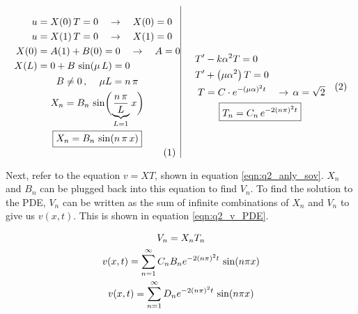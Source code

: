 \documentclass[12pt]{article}
\begin{document}
\begin{subequations}
\begin{array}{c|c}
\begin{minipage}{0.48\textwidth}
\begin{equation}
\begin{gathered}
                \begin{aligned}
                    u &= X(0) \, T = 0 \quad \rightarrow \quad X(0) = 0\\
                    u &= X(1) \, T = 0 \quad \rightarrow \quad X(1) = 0\\
                    X(0) &= A(1) + B(0) = 0 \quad \rightarrow \quad A = 0\\
                    X(L)& = 0 + B \, \sin(\mu\,L) = 0
                \end{aligned}\\
                B \ne 0\, , \quad \, \mu L = n \, \pi \\
                X_n = B_n \, \sin \biggl( \underbrace{\frac{n\,\pi}{L}}_{L=1} x \biggr) \\
                \boxed{X_n = B_n \, \sin(n\,\pi\,x)}
            \end{gathered}\end{equation}
        \end{minipage}
        &
        \begin{minipage}{0.48\textwidth}
            \label{eqn:q2_anly_right}
            \begin{equation}\begin{gathered}
                \begin{aligned}
                    T' &- k \alpha^2 T = 0 \\
                    T' &+ \left( \mu \alpha^2 \right) T = 0 \\
                    T &= C \cdot e^{-(\mu \alpha)^2 t} \quad \rightarrow \, \alpha = \sqrt{2}
                \end{aligned} \\
                \boxed{T_n = C_n \, e^{-2 (n \pi)^2 t}}
            \end{gathered}\end{equation}
        \end{minipage}
    \end{array}
\end{subequations}

Next, refer to the equation $v = XT$, shown in equation \ref{eqn:q2_anly_sov}. $X_n$ and $B_n$ can be plugged back into this equation to find $V_n$. To find the solution to the PDE, $V_n$ can be written as the sum of infinite combinations of $X_n$ and $V_n$ to give us $v(x,t)$. This is shown in equation \ref{eqn:q2_v_PDE}.

\begin{equation}
    \label{eqn:q2_v_PDE}
    \centering
    \begin{gathered}
        V_n = X_n T_n \\
        v(x,t) = \sum_{n=1}^{\infty} C_n  B_n e^{-2(n \pi)^2 t} \, \sin(n \pi x) \\
        v(x,t) = \sum_{n=1}^{\infty} D_n e^{-2(n \pi)^2 t} \, \sin(n \pi x)
    \end{gathered}
\end{equation}
\end{document}
